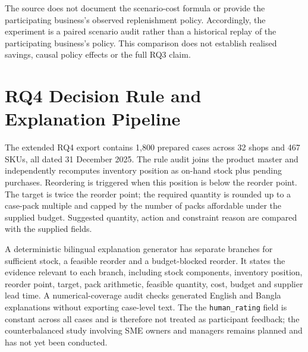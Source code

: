 The source does not document the scenario-cost formula or provide
the participating business's observed replenishment policy. Accordingly,
the experiment is a paired scenario audit rather than a historical replay
of the participating business's policy. This comparison does not establish
realised savings, causal policy effects or the full RQ3 claim.

\section{RQ4 Decision Rule and Explanation Pipeline}

The extended RQ4 export contains 1,800 prepared cases across 32 shops and
467 SKUs, all dated 31 December 2025. The rule audit joins the product
master and independently recomputes inventory position as on-hand stock
plus pending purchases. Reordering is triggered when this position is below
the reorder point. The target is twice the reorder point; the required
quantity is rounded up to a case-pack multiple and capped by the number of
packs affordable under the supplied budget. Suggested quantity, action and
constraint reason are compared with the supplied fields.

A deterministic bilingual explanation generator has separate branches for
sufficient stock, a feasible reorder and a budget-blocked reorder. It states
the evidence relevant to each branch, including stock components, inventory
position, reorder point, target, pack arithmetic, feasible quantity, cost,
budget and supplier lead time. A numerical-coverage audit checks generated
English and Bangla explanations without exporting case-level text. The
the \texttt{human\_rating} field is constant across all cases and is therefore not treated as participant feedback; the
counterbalanced study involving SME owners and managers remains planned and has not yet been conducted.

